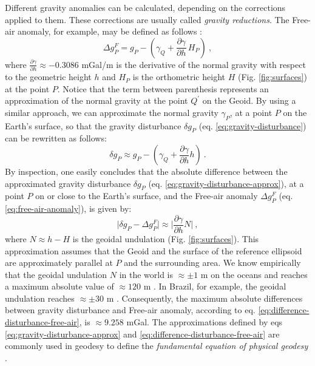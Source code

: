 \documentclass[extra]{gji}
\begin{document}
Different gravity anomalies can be calculated, 
depending on the corrections applied to them. 
These corrections are usually called \textit{gravity reductions}. 
The Free-air anomaly, for example, may be defined as 
follows \citep{blakely1996, hofmann-wellenhof-moritz2005}:
\begin{equation}
\Delta g_{P}^{F} 
= g_{P} - \left( \gamma_{Q} + \frac{\partial \gamma}{\partial h} \, H_{P} \right) \: ,
\label{eq:free-air-anomaly}
\end{equation}
where $\frac{\partial \gamma}{\partial h} \approx -0.3086$ mGal/m is the
derivative of the normal gravity with respect to the geometric height $h$
and $H_{P}$ is the orthometric height $H$ (Fig. \ref{fig:surfaces}) at the
point $P$.
Notice that the term between parenthesis represents an 
approximation of the normal gravity at the point $Q^{\prime}$ on the
Geoid. By using a similar approach, we can approximate the normal gravity
$\gamma_{P}$, at a point $P$ on the Earth's surface, so that the 
gravity disturbance $\delta g_{P}$ (eq. \ref{eq:gravity-disturbance}) 
can be rewritten as follows:
\begin{equation}
\delta g_{P} \approx g_{P} - 
\left( \gamma_{Q} + \frac{\partial \gamma}{\partial h} h \right) \: .
\label{eq:gravity-disturbance-approx}
\end{equation}
By inspection, one easily concludes that the absolute difference 
between the approximated gravity disturbance $\delta g_{P}$ 
(eq. \ref{eq:gravity-disturbance-approx}), at a point $P$ on or close to
the Earth's surface, and the Free-air anomaly
$\Delta g_{P}^{F}$ (eq. \ref{eq:free-air-anomaly}), is given by:
\begin{equation}
\vert \delta g_{P} - \Delta g^{F}_{P} \vert \approx 
\vert \frac{\partial \gamma}{\partial h} N \vert \: ,
\label{eq:difference-disturbance-free-air}
\end{equation}
where $N \approx h - H$ is the geoidal undulation (Fig. \ref{fig:surfaces}).
This approximation assumes that the Geoid and the surface of 
the reference ellipsoid are approximately parallel at $P$ 
and the surrounding area.
We know empirically that the geoidal undulation $N$ in the world 
is $\approx \pm 1$ m on the oceans and reaches a 
maximum absolute value of $\approx 120$ m \citep[e.g.,][]{torge2012, 
sanso_sideris2013}. In Brazil, for example, the geoidal undulation 
reaches $\approx \pm 30$ m \citep{ibge_mapgeo2015}. Consequently, the
maximum absolute differences between gravity disturbance and
Free-air anomaly, according to eq. \ref{eq:difference-disturbance-free-air},
is $\approx 9.258$ mGal.
The approximations defined by eqs \ref{eq:gravity-disturbance-approx}
and \ref{eq:difference-disturbance-free-air} are commonly used
in geodesy to define the \textit{fundamental equation of physical
geodesy} \citep{hofmann-wellenhof-moritz2005}.
\end{document}
